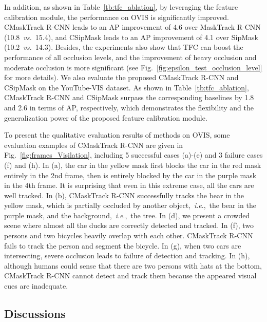 \documentclass[twocolumn]{svjour3}          \smartqed  \usepackage{graphicx}
\newcommand{\ie}{\textit{i}.\textit{e}.}
\begin{document}
\begin{sloppypar}
In addition, as shown in Table~\ref{tb:tfc_ablation}, by leveraging the feature calibration module, the performance on OVIS is significantly improved. CMaskTrack R-CNN leads to an AP improvement of 4.6 over MaskTrack R-CNN  (10.8~\textit{vs.}~15.4), and CSipMask leads to an AP improvement of 4.1 over SipMask (10.2~\textit{vs.}~14.3). Besides, the experiments also show that TFC can boost the performance of all occlusion levels, and the improvement of heavy occlusion and moderate occlusion is more significant (see Fig.~\ref{fig:epsilon_test_occlusion_level} for more details). We also evaluate the proposed CMaskTrack R-CNN and CSipMask on the YouTube-VIS dataset. As shown in Table~\ref{tb:tfc_ablation}, CMaskTrack R-CNN and CSipMask surpass the corresponding baselines by 1.8 and 2.6 in terms of AP, respectively, which demonstrates the flexibility and the generalization power of the proposed feature calibration module.

To present the qualitative evaluation results of methods on OVIS, some evaluation examples of CMaskTrack R-CNN are given in Fig.~\ref{fig:frames_Visilation}, including 5 successful cases (a)-(e) and 3 failure cases (f) and (h). In (a), the car in the yellow mask first blocks the car in the red mask entirely in the 2nd frame, then is entirely blocked by the car in the purple mask in the 4th frame. It is surprising that even in this extreme case, all the cars are well tracked. In (b), CMaskTrack R-CNN successfully tracks the bear in the yellow mask, which is partially occluded by another object,~\ie,~the bear in the purple mask, and the background,~\ie,~the tree. In (d), we present a crowded scene where almost all the ducks are correctly detected and tracked. In (f), two persons and two bicycles heavily overlap with each other. CMaskTrack R-CNN fails to track the person and segment the bicycle. In (g), when two cars are intersecting, severe occlusion leads to failure of detection and tracking. In (h), although humans could sense that there are two persons with hats at the bottom, CMaskTrack R-CNN cannot detect and track them because the appeared visual cues are inadequate.

\subsection{Discussions}


\end{sloppypar}
\end{document}
